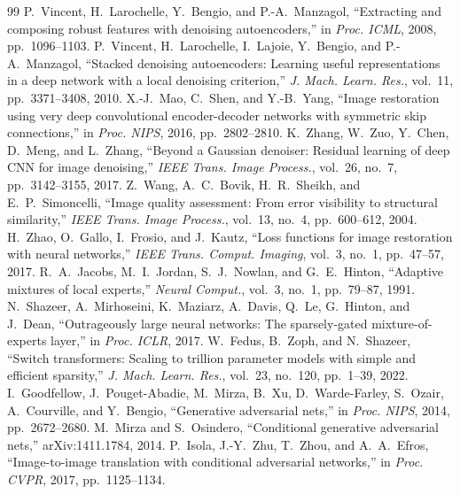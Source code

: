 \documentclass[conference]{IEEEtran}
\begin{document}
\clearpage
\begin{thebibliography}{99}\footnotesize
{} P.~Vincent, H.~Larochelle, Y.~Bengio, and P.-A.~Manzagol, ``Extracting and composing robust features with denoising autoencoders,'' in \emph{Proc. ICML}, 2008, pp.~1096--1103.
 P.~Vincent, H.~Larochelle, I.~Lajoie, Y.~Bengio, and P.-A.~Manzagol, ``Stacked denoising autoencoders: Learning useful representations in a deep network with a local denoising criterion,'' \emph{J. Mach. Learn. Res.}, vol.~11, pp.~3371--3408, 2010.
 X.-J.~Mao, C.~Shen, and Y.-B.~Yang, ``Image restoration using very deep convolutional encoder-decoder networks with symmetric skip connections,'' in \emph{Proc. NIPS}, 2016, pp.~2802--2810.
 K.~Zhang, W.~Zuo, Y.~Chen, D.~Meng, and L.~Zhang, ``Beyond a Gaussian denoiser: Residual learning of deep CNN for image denoising,'' \emph{IEEE Trans. Image Process.}, vol.~26, no.~7, pp.~3142--3155, 2017.
 Z.~Wang, A.~C.~Bovik, H.~R.~Sheikh, and E.~P.~Simoncelli, ``Image quality assessment: From error visibility to structural similarity,'' \emph{IEEE Trans. Image Process.}, vol.~13, no.~4, pp.~600--612, 2004.
 H.~Zhao, O.~Gallo, I.~Frosio, and J.~Kautz, ``Loss functions for image restoration with neural networks,'' \emph{IEEE Trans. Comput. Imaging}, vol.~3, no.~1, pp.~47--57, 2017.
 R.~A.~Jacobs, M.~I.~Jordan, S.~J.~Nowlan, and G.~E.~Hinton, ``Adaptive mixtures of local experts,'' \emph{Neural Comput.}, vol.~3, no.~1, pp.~79--87, 1991.
 N.~Shazeer, A.~Mirhoseini, K.~Maziarz, A.~Davis, Q.~Le, G.~Hinton, and J.~Dean, ``Outrageously large neural networks: The sparsely-gated mixture-of-experts layer,'' in \emph{Proc. ICLR}, 2017.
 W.~Fedus, B.~Zoph, and N.~Shazeer, ``Switch transformers: Scaling to trillion parameter models with simple and efficient sparsity,'' \emph{J. Mach. Learn. Res.}, vol.~23, no.~120, pp.~1--39, 2022.
 I.~Goodfellow, J.~Pouget-Abadie, M.~Mirza, B.~Xu, D.~Warde-Farley, S.~Ozair, A.~Courville, and Y.~Bengio, ``Generative adversarial nets,'' in \emph{Proc. NIPS}, 2014, pp.~2672--2680.
 M.~Mirza and S.~Osindero, ``Conditional generative adversarial nets,'' arXiv:1411.1784, 2014.
 P.~Isola, J.-Y.~Zhu, T.~Zhou, and A.~A.~Efros, ``Image-to-image translation with conditional adversarial networks,'' in \emph{Proc. CVPR}, 2017, pp.~1125--1134.

\end{thebibliography}
\end{document}
